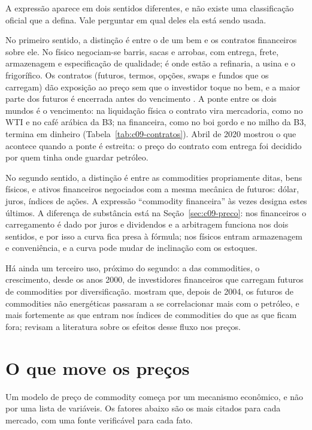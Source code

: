 A expressão aparece em dois sentidos diferentes, e não existe uma classificação oficial que a defina. Vale perguntar em qual deles ela está sendo usada.

No primeiro sentido, a distinção é entre o  de um bem e os contratos financeiros sobre ele. No físico negociam-se barris, sacas e arrobas, com entrega, frete, armazenagem e especificação de qualidade; é onde estão a refinaria, a usina e o frigorífico. Os contratos (futuros, termos, opções, swaps e fundos que os carregam) dão exposição ao preço sem que o investidor toque no bem, e a maior parte dos futuros é encerrada antes do vencimento \citep[cap.~2]{hull2022}. A ponte entre os dois mundos é o vencimento: na liquidação física o contrato vira mercadoria, como no WTI e no café arábica da B3; na financeira, como no boi gordo e no milho da B3, termina em dinheiro (Tabela~\ref{tab:c09-contratos}). Abril de 2020 mostrou o que acontece quando a ponte é estreita: o preço do contrato com entrega foi decidido por quem tinha onde guardar petróleo.

No segundo sentido, a distinção é entre as commodities propriamente ditas, bens físicos, e ativos financeiros negociados com a mesma mecânica de futuros: dólar, juros, índices de ações. A expressão ``commodity financeira'' às vezes designa estes últimos. A diferença de substância está na Seção~\ref{sec:c09-preco}: nos financeiros o carregamento é dado por juros e dividendos e a arbitragem funciona nos dois sentidos, e por isso a curva fica presa à fórmula; nos físicos entram armazenagem e conveniência, e a curva pode mudar de inclinação com os estoques.

Há ainda um terceiro uso, próximo do segundo: a  das commodities, o crescimento, desde os anos 2000, de investidores financeiros que carregam futuros de commodities por diversificação. \citet{tang2012} mostram que, depois de 2004, os futuros de commodities não energéticas passaram a se correlacionar mais com o petróleo, e mais fortemente as que entram nos índices de commodities do que as que ficam fora; \citet{cheng2014} revisam a literatura sobre os efeitos desse fluxo nos preços.

\section{O que move os preços}
\label{sec:c09-fatores}

Um modelo de preço de commodity começa por um mecanismo econômico, e não por uma lista de variáveis. Os fatores abaixo são os mais citados para cada mercado, com uma fonte verificável para cada fato.

